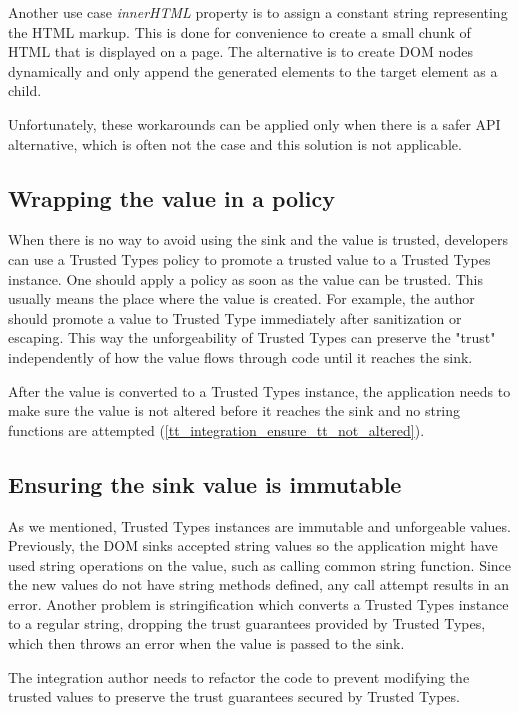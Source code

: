 Another use case \emph{innerHTML} property is to assign a constant string representing the HTML
markup. This is done for convenience to create a small chunk of HTML that is displayed on a page.
The alternative is to create DOM nodes dynamically and only append the generated elements to the
target element as a child.

Unfortunately, these workarounds can be applied only when there is a safer API alternative, which is
often not the case and this solution is not applicable.

\subsection{Wrapping the value in a policy}

When there is no way to avoid using the sink and the value is trusted, developers can use a Trusted
Types policy to promote a trusted value to a Trusted Types instance. One should apply a policy as
soon as the value can be trusted. This usually means the place where the value is created. For
example, the author should promote a value to Trusted Type immediately after sanitization or
escaping. This way the unforgeability of Trusted Types can preserve the "trust" independently of how
the value flows through code until it reaches the sink.

After the value is converted to a Trusted Types instance, the application needs to make sure the
value is not altered before it reaches the sink and no string functions are attempted
(\ref{tt_integration_ensure_tt_not_altered}).

\label{tt_integration_ensure_tt_not_altered}
\subsection{Ensuring the sink value is immutable}

As we mentioned, Trusted Types instances are immutable and unforgeable values. Previously, the DOM
sinks accepted string values so the application might have used string operations on the value, such
as calling common string function. Since the new values do not have string methods defined, any call
attempt results in an error. Another problem is stringification which converts a Trusted Types
instance to a regular string, dropping the trust guarantees provided by Trusted Types, which then
throws an error when the value is passed to the sink.

The integration author needs to refactor the code to prevent modifying the trusted values to
preserve the trust guarantees secured by Trusted Types.

